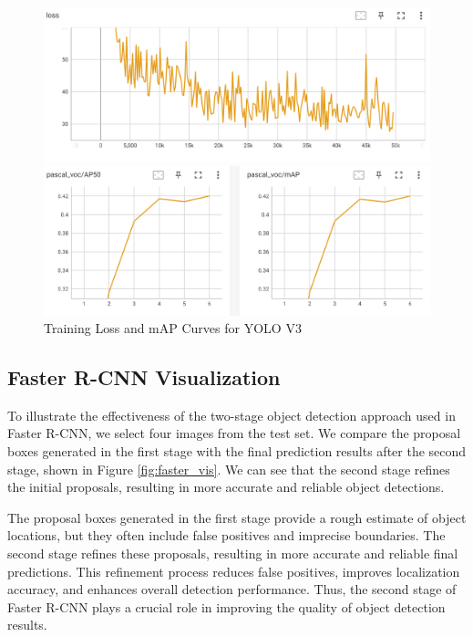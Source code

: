 \documentclass[UTF8]{ctexart}
\begin{document}
\begin{figure}[H]
    \centering
    \begin{minipage}{0.45\textwidth}
        \centering
        \includegraphics[width=\textwidth]{figs/TensorBoard/VOC_yolov3/yolo_loss.png}
    \end{minipage}
    \hfill
    \begin{minipage}{0.45\textwidth}
        \centering
        \includegraphics[width=\textwidth]{figs/TensorBoard/VOC_yolov3/yolo_mAP.png}
    \end{minipage}
    \caption{Training Loss and mAP Curves for YOLO V3}
    \label{fig:yololoss}
\end{figure}

\subsection{Faster R-CNN Visualization}
To illustrate the effectiveness of the two-stage object detection approach used in Faster R-CNN, 
we select four images from the test set. 
We compare the proposal boxes generated in the first stage with the final prediction results after the second stage, shown in Figure \ref{fig:faster_vis}.
We can see that the second stage refines the initial proposals, resulting in more accurate and reliable object detections.

The proposal boxes generated in the first stage provide a rough estimate of object locations, but they often include false positives and imprecise boundaries. The second stage refines these proposals, resulting in more accurate and reliable final predictions. This refinement process reduces false positives, improves localization accuracy, and enhances overall detection performance.
Thus, the second stage of Faster R-CNN plays a crucial role in improving the quality of object detection results.
\end{document}
